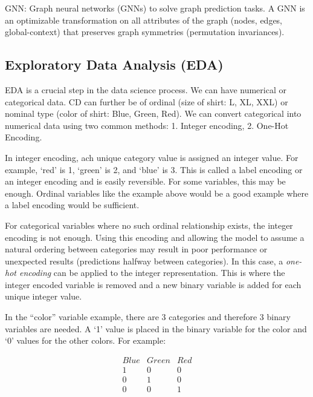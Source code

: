 \documentclass[11pt]{article}
\begin{document}
GNN: Graph neural networks (GNNs) to solve graph prediction tasks. A GNN is an optimizable transformation on all attributes of the graph (nodes, edges, global-context) that preserves graph symmetries (permutation invariances).


\subsection{Exploratory Data Analysis (EDA)}

EDA is a crucial step in the data science process. We can have numerical or categorical data. 
CD can further be of ordinal (size of shirt: L, XL, XXL) or nominal type (color of shirt: Blue, Green, Red). 
We can convert categorical into numerical data using two common methods: 1. Integer encoding, 
2. One-Hot Encoding. 

In integer encoding, ach unique category value is assigned an integer value.
For example, `red' is 1, `green' is 2, and `blue' is 3. This is called a label encoding or an integer encoding and is 
easily reversible. For some variables, this may be enough.
Ordinal variables like the example above would be a good example where a label encoding would be sufficient.


For categorical variables where no such ordinal relationship exists, the integer encoding is not enough.
Using this encoding and allowing the model to assume a natural ordering between categories may result in poor performance 
or unexpected results (predictions halfway between categories). In this case, a \emph{one-hot encoding} 
can be applied to the integer representation. 
This is where the integer encoded variable is 
removed and a new binary variable is added for each 
unique integer value.

In the “color” variable example, 
there are 3 categories and 
therefore 3 binary variables are needed. 
A `1' value is placed in the binary variable for the color and 
`0' values for the other colors. For example:

\begin{equation}
\begin{matrix}
Blue & Green & Red\\
1 & 0 & 0 \\
0 & 1 & 0 \\
0 & 0 & 1 
\end{matrix}
\end{equation}
\end{document}

